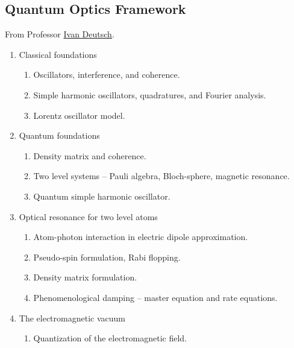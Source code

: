 \documentclass[letterpaper,10pt,english]{sphinxmanual}
\begin{document}
\subsection{Quantum Optics Framework}
\label{Quantum/QuantumOptics:quantum-optics-framework}
From Professor \href{http://info.phys.unm.edu/~ideutsch/Classes/Phys566F13/index.htm\#syllabus}{Ivan Deutsch}.
\begin{enumerate}
\item {} 
Classical foundations
\begin{enumerate}
\item {} 
Oscillators, interference, and coherence.

\item {} 
Simple harmonic oscillators, quadratures, and Fourier analysis.

\item {} 
Lorentz oscillator model.

\end{enumerate}

\item {} 
Quantum foundations
\begin{enumerate}
\item {} 
Density matrix and coherence.

\item {} 
Two level systems -- Pauli algebra, Bloch-sphere, magnetic resonance.

\item {} 
Quantum simple harmonic oscillator.

\end{enumerate}

\item {} 
Optical resonance for two level atoms
\begin{enumerate}
\item {} 
Atom-photon interaction in electric dipole approximation.

\item {} 
Pseudo-spin formulation, Rabi flopping.

\item {} 
Density matrix formulation.

\item {} 
Phenomenological damping -- master equation and rate equations.

\end{enumerate}

\item {} 
The electromagnetic vacuum
\begin{enumerate}
\item {} 
Quantization of the electromagnetic field.


\end{enumerate}
\end{enumerate}
\end{document}
